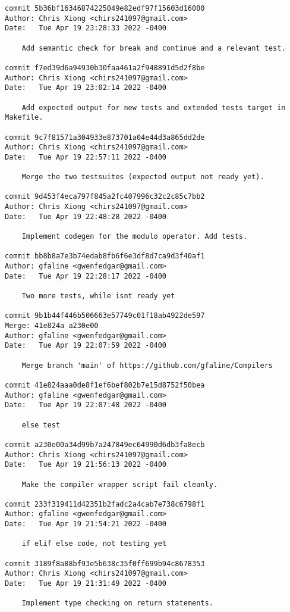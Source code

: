 {\begin{verbatim}
commit 5b36bf16346874225049e82edf97f15603d16000
Author: Chris Xiong <chirs241097@gmail.com>
Date:   Tue Apr 19 23:28:33 2022 -0400

    Add semantic check for break and continue and a relevant test.

commit f7ed39d6a94930b30faa461a2f948891d5d2f8be
Author: Chris Xiong <chirs241097@gmail.com>
Date:   Tue Apr 19 23:02:14 2022 -0400

    Add expected output for new tests and extended tests target in Makefile.

commit 9c7f81571a304933e873701a04e44d3a865dd2de
Author: Chris Xiong <chirs241097@gmail.com>
Date:   Tue Apr 19 22:57:11 2022 -0400

    Merge the two testsuites (expected output not ready yet).

commit 9d453f4eca797f845a2fc407996c32c2c85c7bb2
Author: Chris Xiong <chirs241097@gmail.com>
Date:   Tue Apr 19 22:48:28 2022 -0400

    Implement codegen for the modulo operator. Add tests.

commit bb8b8a7e3b74edab8fb6f6e3df8d7ca9d3f40af1
Author: gfaline <gwenfedgar@gmail.com>
Date:   Tue Apr 19 22:28:17 2022 -0400

    Two more tests, while isnt ready yet

commit 9b1b44f446b506663e57749c01f18ab4922de597
Merge: 41e824a a230e00
Author: gfaline <gwenfedgar@gmail.com>
Date:   Tue Apr 19 22:07:59 2022 -0400

    Merge branch 'main' of https://github.com/gfaline/Compilers

commit 41e824aaa0de8f1ef6bef802b7e15d8752f50bea
Author: gfaline <gwenfedgar@gmail.com>
Date:   Tue Apr 19 22:07:48 2022 -0400

    else test

commit a230e00a34d99b7a247849ec64990d6db3fa8ecb
Author: Chris Xiong <chirs241097@gmail.com>
Date:   Tue Apr 19 21:56:13 2022 -0400

    Make the compiler wrapper script fail cleanly.

commit 233f319411d42351b2fadc2a4cab7e738c6798f1
Author: gfaline <gwenfedgar@gmail.com>
Date:   Tue Apr 19 21:54:21 2022 -0400

    if elif else code, not testing yet

commit 3189f8a88bf93e5b638c35f0ff699b94c8678353
Author: Chris Xiong <chirs241097@gmail.com>
Date:   Tue Apr 19 21:31:49 2022 -0400

    Implement type checking on return statements.


\end{verbatim}}
